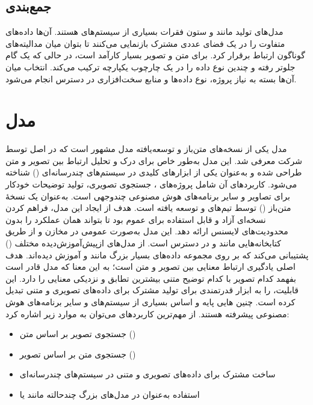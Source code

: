 \documentclass{article}
\begin{document}
\subsection{جمع‌بندی}
مدل‌های تولید  مانند  و  ستون فقرات بسیاری از سیستم‌های  هستند.
آن‌ها داده‌های متفاوت را در یک فضای عددی مشترک بازنمایی می‌کنند تا بتوان میان مدالیته‌های گوناگون ارتباط برقرار کرد.
 برای متن و تصویر بسیار کارآمد است، در حالی که  یک گام جلوتر رفته و چندین نوع داده را در یک چارچوب یکپارچه ترکیب می‌کند.
انتخاب میان آن‌ها بسته به نیاز پروژه، نوع داده‌ها و منابع سخت‌افزاری در دسترس انجام می‌شود.


\section{مدل }
مدل  یکی از نسخه‌های متن‌باز و توسعه‌یافته مدل مشهور  است که در اصل توسط شرکت  معرفی شد.
این مدل به‌طور خاص برای درک و تحلیل ارتباط بین تصویر و متن طراحی شده و به‌عنوان یکی از ابزارهای کلیدی در سیستم‌های چندرسانه‌ای () شناخته می‌شود.
کاربردهای آن شامل پروژه‌های ، جستجوی تصویری، تولید توضیحات خودکار برای تصاویر و سایر برنامه‌های هوش مصنوعی چندوجهی است.
 به‌عنوان یک نسخهٔ متن‌باز () توسط تیم‌های  و  توسعه یافته است.
هدف از ایجاد این مدل، فراهم کردن نسخه‌ای آزاد و قابل استفاده برای عموم بود تا بتواند همان عملکرد  را بدون محدودیت‌های لایسنس  ارائه دهد.
این مدل به‌صورت عمومی در مخازن  و از طریق کتابخانه‌هایی مانند  و  در دسترس است.
 از مدل‌های ازپیش‌آموزش‌دیده مختلف () پشتیبانی می‌کند که بر روی مجموعه داده‌های بسیار بزرگ مانند  و  آموزش دیده‌اند.
هدف اصلی  یادگیری ارتباط معنایی بین تصویر و متن است؛
به این معنا که مدل قادر است بفهمد کدام تصویر با کدام توضیح متنی بیشترین تطابق و نزدیکی معنایی را دارد.
این قابلیت،  را به ابزار قدرتمندی برای تولید  مشترک برای داده‌های تصویری و متنی تبدیل کرده است.
چنین هایی پایه و اساس بسیاری از سیستم‌های  و سایر برنامه‌های هوش مصنوعی پیشرفته هستند.
از مهم‌ترین کاربردهای  می‌توان به موارد زیر اشاره کرد:
\begin{itemize}
\item جستجوی تصویر بر اساس متن ()
\item جستجوی متن بر اساس تصویر ()
\item ساخت  مشترک برای داده‌های تصویری و متنی در سیستم‌های چندرسانه‌ای
\item استفاده به‌عنوان  در مدل‌های بزرگ چندحالته مانند  یا 
\end{itemize}
\end{document}
